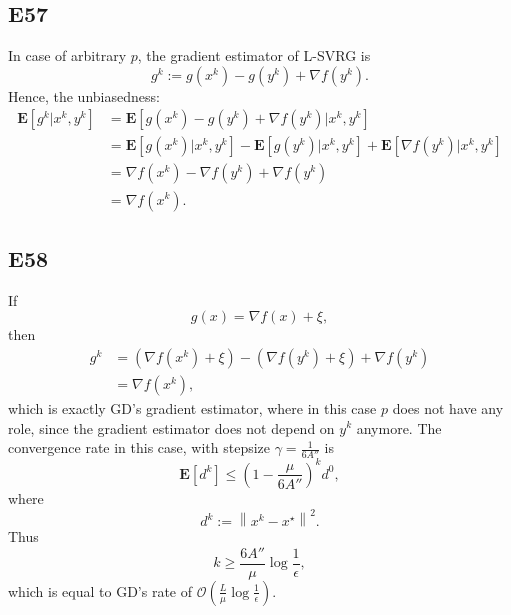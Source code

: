 \documentclass[12pt]{article}
\begin{document}
\subsection*{E57}
In case of arbitrary $p$, the gradient estimator of L-SVRG is
\begin{equation*}
    g^k := g(x^k) - g(y^k) + \nabla f(y^k).
\end{equation*}
Hence, the unbiasedness:
\begin{equation*}
    \begin{split}
        \mathbf{E}[g^k|x^k, y^k] &= \mathbf{E}[g(x^k) - g(y^k) + \nabla f(y^k)|x^k, y^k] \\
        &= \mathbf{E}[g(x^k)|x^k, y^k] - \mathbf{E}[g(y^k)|x^k, y^k] + \mathbf{E}[\nabla f(y^k)|x^k, y^k] \\
        &= \nabla f(x^k) - \nabla f(y^k) + \nabla f(y^k)\\
        &= \nabla f(x^k).
    \end{split}
\end{equation*}

\subsection*{E58}
If
\begin{equation*}
    g(x) = \nabla f(x) + \xi,
\end{equation*}
then
\begin{equation*}
    \begin{split}
        g^k &= (\nabla f(x^k) + \xi) - (\nabla f(y^k) + \xi) + \nabla f(y^k) \\
            &= \nabla f(x^k),
    \end{split}
\end{equation*}
which is exactly GD's gradient estimator, where in this case $p$ does not have any role, since the gradient estimator does not depend on $y^k$ anymore. 
The convergence rate in this case, with stepsize $\gamma = \frac{1}{6A''}$ is
\begin{equation*}
    \mathbf{E}[d^k] \leq \left(1 - \frac{\mu}{6A''}\right)^kd^0,
\end{equation*}
where
\begin{equation*}
    d^k := \left\| x^k - x^\star \right\|^2.
\end{equation*}
Thus
\begin{equation*}
    k \geq \frac{6A''}{\mu}\log\frac{1}{\epsilon},
\end{equation*}
which is equal to GD's rate of $\mathcal{O}\left(\frac{L}{\mu}\log\frac{1}{\epsilon}\right)$.
\vspace{0.1cm}
\end{document}

